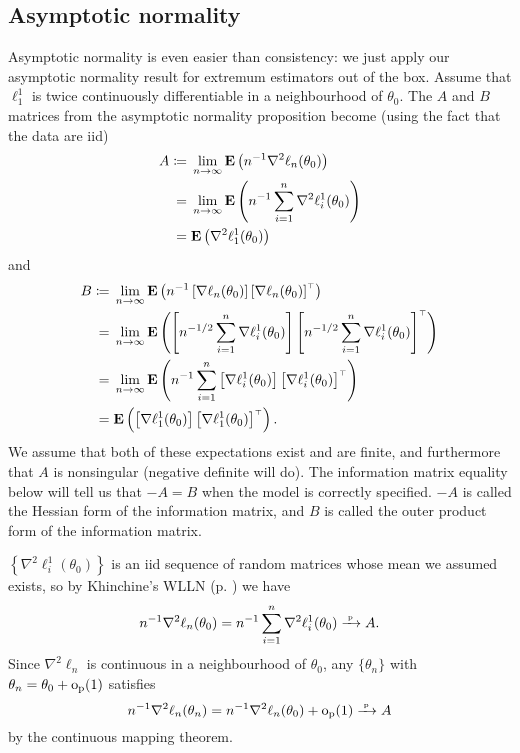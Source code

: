 \documentclass[11pt,letterpaper,reqno,oneside]{article}
\begin{document}
\subsection{Asymptotic normality}
\label{sec:MLE:asymptotic_normality}

Asymptotic normality is even easier than consistency: we just apply our asymptotic normality result for extremum estimators out of the box. Assume that $\ell_1^1$ is twice continuously differentiable in a neighbourhood of $\theta_0$. The $A$ and $B$ matrices from the asymptotic normality proposition become (using the fact that the data are iid)
%
\begin{align*}
	A 
	\coloneqq{}& \lim_{n\to\infty} \mathbf{E}\left( n^{-1} \nabla^2 \ell_n(\theta_0) \right)
	\\
	={}& \lim_{n\to\infty}
	\mathbf{E}\left( n^{-1} \sum_{i=1}^n \nabla^2 \ell^1_i(\theta_0) \right)
	\\
	={}& \mathbf{E}\left( \nabla^2 \ell^1_1(\theta_0) \right)
\end{align*}
%
and
%
\begin{align*}
	B 
	\coloneqq{}& 
	\lim_{n\to\infty} \mathbf{E}\left( 
	n^{-1} \left[ \nabla \ell_n(\theta_0) \right]
	\left[ \nabla \ell_n(\theta_0) \right]^{\scriptscriptstyle \top}
	\right)
	\\
	={}& \lim_{n\to\infty} \mathbf{E}\left( 
	\left[ n^{-1/2} \sum_{i=1}^n \nabla \ell^1_i(\theta_0) \right]
	\left[ n^{-1/2} \sum_{i=1}^n \nabla \ell^1_i(\theta_0) \right]^{\scriptscriptstyle \top}
	\right) 
	\\
	={}& \lim_{n\to\infty} \mathbf{E}\left( 
	n^{-1} \sum_{i=1}^n \left[ \nabla \ell^1_i(\theta_0) \right] 
	\left[ \nabla \ell^1_i(\theta_0) \right]^{\scriptscriptstyle \top}
	\right) 
	\\
	={}& \mathbf{E}\left( \left[ \nabla \ell^1_1(\theta_0) \right] 
	\left[ \nabla \ell^1_1(\theta_0) \right]^{\scriptscriptstyle \top}
	\right) .
\end{align*}
%
We assume that both of these expectations exist and are finite, and furthermore that $A$ is nonsingular (negative definite will do). The information matrix equality below will tell us that $-A=B$ when the model is correctly specified. $-A$ is called the Hessian form of the information matrix, and $B$ is called the outer product form of the information matrix.


$\left\{ \nabla^2 \ell_i^1(\theta_0) \right\}$ is an iid sequence of random matrices whose mean we assumed exists, so by Khinchine's WLLN (p. \pageref{corollary:Khinchine_WLLN}) we have
%
\begin{equation*}
	n^{-1} \nabla^2 \ell_n(\theta_0) 
	= n^{-1} \sum_{i=1}^n \nabla^2 \ell^1_i(\theta_0) 
	\xrightarrow{{\scriptscriptstyle \mathrm{\;p\;}}} A .
\end{equation*}
%
Since $\nabla^2 \ell_n$ is continuous in a neighbourhood of $\theta_0$, any $\{ \theta_n \}$ with $\theta_n = \theta_0 + \mathrm{o}_{\mathrm{p}}(1)$ satisfies
%
\begin{equation*}
	n^{-1} \nabla^2 \ell_n(\theta_n) 
	= n^{-1} \nabla^2 \ell_n(\theta_0) + \mathrm{o}_{\mathrm{p}}(1) 
	\xrightarrow{{\scriptscriptstyle \mathrm{\;p\;}}} A 
\end{equation*}
%
by the continuous mapping theorem.
\end{document}

